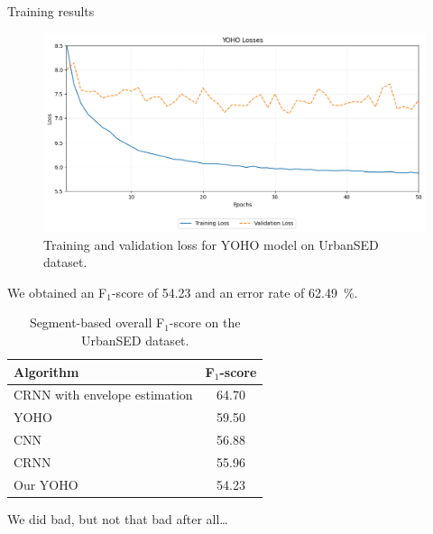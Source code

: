 	\begin{frame}[allowframebreaks]{Training results}
		\begin{figure}
			\centering
			\includegraphics[width=.7\textwidth]{images/losses.png}

			\caption{Training and validation loss for YOHO model on UrbanSED dataset.}
			\label{fig:trainingLosses}
		\end{figure}
		\framebreak
		We obtained an F$_{1}$-score of \SI{54.23}{} and an error rate of \SI{62.49}{\percent}.
		\begin{table}[h!]
    		\centering
    		\begin{tabular}{||l|c||}
        		\hline
        		\textbf{Algorithm} & \textbf{F$_{1}$-score} \\
        		\hline
        		CRNN with envelope estimation & 64.70 \\
        		\rowcolor{UNITSIceBlue!50} 
        		YOHO & 59.50 \\
        		CNN & 56.88 \\
        		CRNN & 55.96 \\
        		\rowcolor{UNITSIceBlue!50} 
        		Our YOHO & 54.23 \\
        		\hline
    		\end{tabular}
    		\caption{Segment-based overall F$_{1}$-score on the UrbanSED dataset.}
    		\label{tab:performance}
		\end{table}
		We did bad, but not that bad after all\dots
	\end{frame}
	
	
